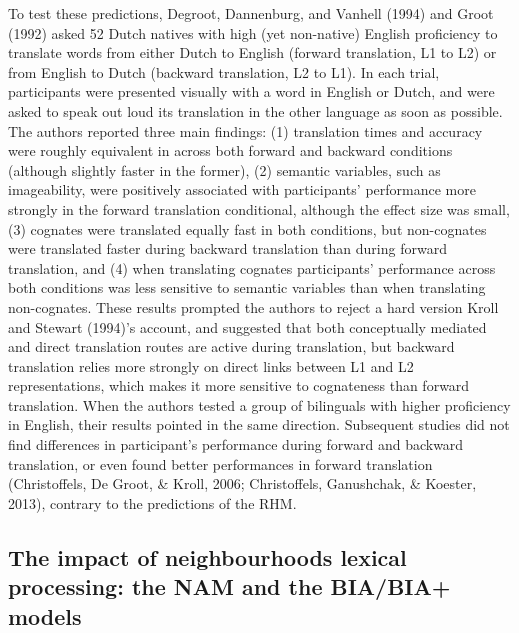\documentclass[
  english,
  man,floatsintext]{apa6}
\begin{document}
To test these predictions, Degroot, Dannenburg, and Vanhell (1994) and Groot (1992) asked 52 Dutch natives with high (yet non-native) English proficiency to translate words from either Dutch to English (forward translation, L1 to L2) or from English to Dutch (backward translation, L2 to L1). In each trial, participants were presented visually with a word in English or Dutch, and were asked to speak out loud its translation in the other language as soon as possible. The authors reported three main findings: (1) translation times and accuracy were roughly equivalent in across both forward and backward conditions (although slightly faster in the former), (2) semantic variables, such as imageability, were positively associated with participants' performance more strongly in the forward translation conditional, although the effect size was small, (3) cognates were translated equally fast in both conditions, but non-cognates were translated faster during backward translation than during forward translation, and (4) when translating cognates participants' performance across both conditions was less sensitive to semantic variables than when translating non-cognates. These results prompted the authors to reject a hard version Kroll and Stewart (1994)'s account, and suggested that both conceptually mediated and direct translation routes are active during translation, but backward translation relies more strongly on direct links between L1 and L2 representations, which makes it more sensitive to cognateness than forward translation. When the authors tested a group of bilinguals with higher proficiency in English, their results pointed in the same direction. Subsequent studies did not find differences in participant's performance during forward and backward translation, or even found better performances in forward translation (Christoffels, De Groot, \& Kroll, 2006; Christoffels, Ganushchak, \& Koester, 2013), contrary to the predictions of the RHM.

\hypertarget{the-impact-of-neighbourhoods-lexical-processing-the-nam-and-the-biabia-models}{%
\subsection{The impact of neighbourhoods lexical processing: the NAM and the BIA/BIA+ models}\label{the-impact-of-neighbourhoods-lexical-processing-the-nam-and-the-biabia-models}}
\end{document}
